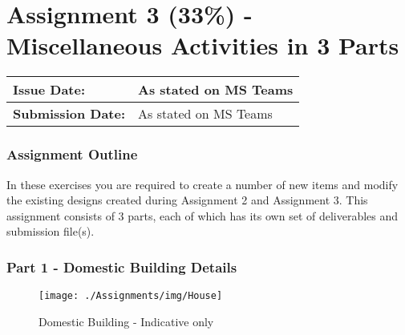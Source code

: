 
	

\part*{Assignment 3 (33\%) - Miscellaneous Activities in 3 Parts}



\begin{tabularx}{\textwidth}{ |X|X| }
	\hline
	\textbf{Issue Date:} & As stated on MS Teams \\
	\hline 
	\textbf{Submission Date:}  & As stated on MS Teams  \\
	\hline
\end{tabularx}



\section*{Assignment Outline}



In these exercises you are required to create a number of new items and modify the existing designs created during Assignment 2 and Assignment 3.  This assignment consists of 3 parts, each of which has its own set of deliverables and submission file(s).

\newpage
\section*{Part 1 - Domestic Building Details}



\begin{figure}
	\centering
	\texttt{[image: ./Assignments/img/House]}
	\caption{Domestic Building - Indicative only}
	\label{fig:house}
\end{figure}



